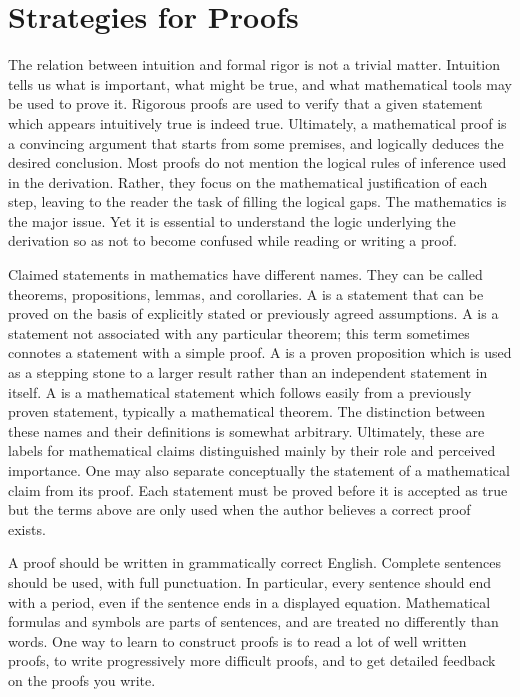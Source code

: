 

\section{Strategies for Proofs}

The relation between intuition and formal rigor is not a trivial matter.
Intuition tells us what is important, what might be true, and what mathematical tools may be used to prove it.
Rigorous proofs are used to verify that a given statement which appears intuitively true is indeed true.
Ultimately, a mathematical proof is a convincing argument that starts from some premises, and logically deduces the desired conclusion.
Most proofs do not mention the logical rules of inference used in the derivation.
Rather, they focus on the mathematical justification of each step, leaving to the reader the task of filling the logical gaps.
The mathematics is the major issue.
Yet it is essential to understand the logic underlying the derivation so as not to become confused while reading or writing a proof.

Claimed statements in mathematics have different names.
They can be called theorems, propositions, lemmas, and corollaries.
A  is a statement that can be proved on the basis of explicitly stated or previously agreed assumptions.
A  is a statement not associated with any particular theorem; this term sometimes connotes a statement with a simple proof.
A  is a proven proposition which is used as a stepping stone to a larger result rather than an independent statement in itself.
A  is a mathematical statement which follows easily from a previously proven statement, typically a mathematical theorem. 
The distinction between these names and their definitions is somewhat arbitrary.
Ultimately, these are labels for mathematical claims distinguished mainly by their role and perceived importance.
One may also separate conceptually the statement of a mathematical claim from its proof.
Each statement must be proved before it is accepted as true but the terms above are only used when the author believes a correct proof exists.

A proof should be written in grammatically correct English.
Complete sentences should be used, with full punctuation.
In particular, every sentence should end with a period, even if the sentence ends in a displayed equation.
Mathematical formulas and symbols are parts of sentences, and are treated no differently than words.
One way to learn to construct proofs is to read a lot of well written proofs, to write progressively more difficult proofs, and to get detailed feedback on the proofs you write.


